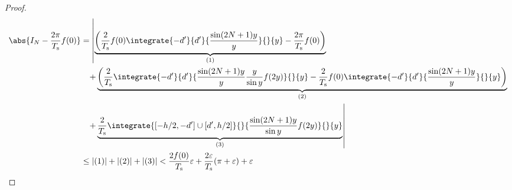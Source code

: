 \begin{proof}
				\begin{align*}
					\abs{I_N - \frac{2\pi}{T_\text{s}} f(0)} &= \left|\underbrace{\left(\frac{2}{T_\text{s}}f(0)\integrate{-d'}{d'}{\frac{\sin(2N+1)y}{y}}{}{y} - \frac{2\pi}{T_\text{s}} f(0)\right)}_{(1)} \right. \\
					&\phantom{=} \left.+ \underbrace{\left(\frac{2}{T_\text{s}}\integrate{-d'}{d'}{\frac{\sin(2N+1)y}{y}\frac{y}{\sin y}f(2y)}{}{y} - \frac{2}{T_\text{s}}f(0)\integrate{-d'}{d'}{\frac{\sin(2N+1)y}{y}}{}{y}\right)}_{(2)} \right. \\
					&\phantom{=} \left.+ \underbrace{\frac{2}{T_\text{s}}\integrate{[-h/2,-d']\cup[d',h/2]}{}{\frac{\sin(2N+1)y}{\sin y}f(2y)}{}{y}}_{(3)}\right| \\
					&\leq |(1)| + |(2)| + |(3)| < \frac{2f(0)}{T_\text{s}}\varepsilon + \frac{2\varepsilon}{T_\text{s}}(\pi+\varepsilon) + \varepsilon
				\end{align*}
			\end{proof}
